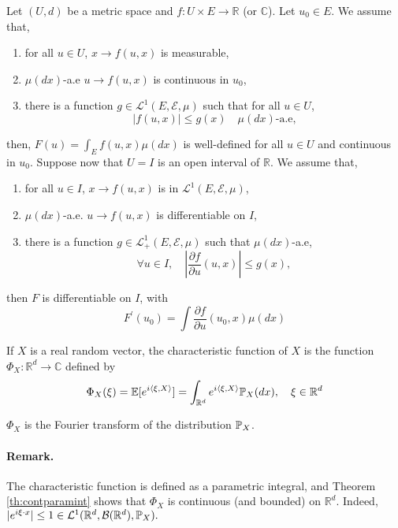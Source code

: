 \documentclass{article}
\begin{document}
\begin{theorem} \label{th:contparamint}
 Let $(U, d)$ be a metric space and $f: U \times E \longrightarrow \mathbb{R}$ (or $\mathbb{C}$). Let $u_{0} \in E$. We assume that,

 \begin{enumerate}
 \item for all $u \in U$,  $x \longrightarrow f(u, x)$ is measurable,
 \item $\mu(dx)$-a.e $u \longrightarrow f(u, x)$ is continuous in $u_{0}$,
 \item there is a function $g \in \mathcal{L}^{1}(E, \mathcal{E}, \mu)$ such
   that for all $u \in U$,
   $$
   |f(u, x)| \leq g(x) \quad \mu(d x) \text{-a.e,}
   $$
 \end{enumerate}
then, $F(u)=\int_E f(u, x) \mu(d x)$ is well-defined for all $u \in U$ and
continuous in $u_{0}$. Suppose now that $U=I$ is an open interval of
$\mathbb{R}$. We assume that,

\begin{enumerate}
\item for all $u \in I$, $x \longrightarrow f(u, x)$ is in  $\mathcal{L}^{1}(E, \mathcal{E}, \mu)$,
\item $\mu(dx)$-a.e. $u \longrightarrow f(u, x)$ is differentiable on $I$,
\item there is a function $g \in \mathcal{L}_{+}^{1}(E, \mathcal{E}, \mu)$ such that $\mu(dx)$-a.e,
  $$
  \forall u \in I, \quad \left|\frac{\partial f}{\partial u}(u, x)\right| \leq g(x),
  $$
\end{enumerate}

then $F$ is differentiable on $I$, with
$$
F^{\prime}\left(u_{0}\right)=\int \frac{\partial f}{\partial u}\left(u_{0}, x\right) \mu(d x)
$$

\end{theorem}

\begin{definition}
  If $X$ is a real random vector, the characteristic function of $X$ is the function
  $\Phi_{X}: \mathbb{R}^{d} \longrightarrow \mathbb{C}$ defined by 
  $$
  \Phi_{X}(\xi)=\E[e^{i \langle \xi,X \rangle}] = \int_{\Rd} e^{i\langle \xi,X \rangle} \P_{X}(d x), \quad \xi \in \mathbb{R}^{d}
  $$

  $\Phi_{X}$ is the Fourier transform of the distribution $\P_X$.
\end{definition}

\paragraph{Remark.} The characteristic function is defined as a parametric integral, and
Theorem \ref{th:contparamint} shows that $\Phi_{X}$ is continuous (and bounded)
on $\mathbb{R}^{d}$. Indeed, $|e^{i \xi \cdot x}| \leq 1 \in  \mathcal{L}^{1}(\Rd, \cB(\Rd), \P_X).$
\end{document}
